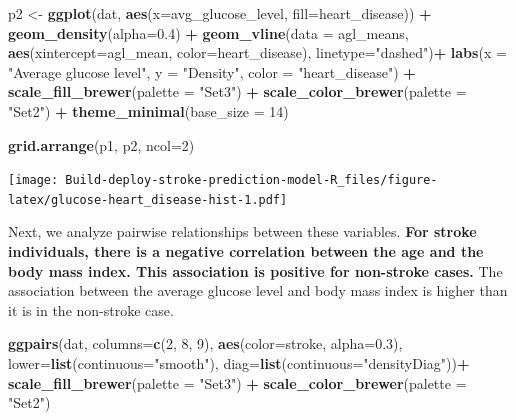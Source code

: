 \documentclass[
]{article}
\newenvironment{Shaded}{\begin{snugshade}}{\end{snugshade}}
\newcommand{\AttributeTok}[1]{\textcolor[rgb]{0.13,0.29,0.53}{#1}}
\newcommand{\DecValTok}[1]{\textcolor[rgb]{0.00,0.00,0.81}{#1}}
\newcommand{\FloatTok}[1]{\textcolor[rgb]{0.00,0.00,0.81}{#1}}
\newcommand{\FunctionTok}[1]{\textcolor[rgb]{0.13,0.29,0.53}{\textbf{#1}}}
\newcommand{\NormalTok}[1]{#1}
\newcommand{\OtherTok}[1]{\textcolor[rgb]{0.56,0.35,0.01}{#1}}
\newcommand{\SpecialCharTok}[1]{\textcolor[rgb]{0.81,0.36,0.00}{\textbf{#1}}}
\newcommand{\StringTok}[1]{\textcolor[rgb]{0.31,0.60,0.02}{#1}}
\begin{document}
\begin{Shaded}
\begin{Highlighting}[]
\NormalTok{p2 }\OtherTok{\textless{}{-}} \FunctionTok{ggplot}\NormalTok{(dat, }\FunctionTok{aes}\NormalTok{(}\AttributeTok{x=}\NormalTok{avg\_glucose\_level, }\AttributeTok{fill=}\NormalTok{heart\_disease)) }\SpecialCharTok{+}  \FunctionTok{geom\_density}\NormalTok{(}\AttributeTok{alpha=}\FloatTok{0.4}\NormalTok{) }\SpecialCharTok{+}
      \FunctionTok{geom\_vline}\NormalTok{(}\AttributeTok{data =}\NormalTok{ agl\_means, }\FunctionTok{aes}\NormalTok{(}\AttributeTok{xintercept=}\NormalTok{agl\_mean, }\AttributeTok{color=}\NormalTok{heart\_disease), }\AttributeTok{linetype=}\StringTok{"dashed"}\NormalTok{)}\SpecialCharTok{+}
      \FunctionTok{labs}\NormalTok{(}\AttributeTok{x =} \StringTok{"Average glucose level"}\NormalTok{, }\AttributeTok{y =} \StringTok{"Density"}\NormalTok{, }\AttributeTok{color =} \StringTok{"heart\_disease"}\NormalTok{) }\SpecialCharTok{+}
      \FunctionTok{scale\_fill\_brewer}\NormalTok{(}\AttributeTok{palette =} \StringTok{"Set3"}\NormalTok{) }\SpecialCharTok{+}
      \FunctionTok{scale\_color\_brewer}\NormalTok{(}\AttributeTok{palette =} \StringTok{"Set2"}\NormalTok{) }\SpecialCharTok{+}
      \FunctionTok{theme\_minimal}\NormalTok{(}\AttributeTok{base\_size =} \DecValTok{14}\NormalTok{) }

\FunctionTok{grid.arrange}\NormalTok{(p1, p2, }\AttributeTok{ncol=}\DecValTok{2}\NormalTok{)}
\end{Highlighting}
\end{Shaded}

\texttt{[image: Build-deploy-stroke-prediction-model-R\_files/figure-latex/glucose-heart\_disease-hist-1.pdf]}

Next, we analyze pairwise relationships between these variables.
\textbf{For stroke individuals, there is a negative correlation between
the age and the body mass index. This association is positive for
non-stroke cases.} The association between the average glucose level and
body mass index is higher than it is in the non-stroke case.

\begin{Shaded}
\begin{Highlighting}[]
\FunctionTok{ggpairs}\NormalTok{(dat, }\AttributeTok{columns=}\FunctionTok{c}\NormalTok{(}\DecValTok{2}\NormalTok{, }\DecValTok{8}\NormalTok{, }\DecValTok{9}\NormalTok{), }\FunctionTok{aes}\NormalTok{(}\AttributeTok{color=}\NormalTok{stroke, }\AttributeTok{alpha=}\FloatTok{0.3}\NormalTok{),}
        \AttributeTok{lower=}\FunctionTok{list}\NormalTok{(}\AttributeTok{continuous=}\StringTok{"smooth"}\NormalTok{), }\AttributeTok{diag=}\FunctionTok{list}\NormalTok{(}\AttributeTok{continuous=}\StringTok{"densityDiag"}\NormalTok{))}\SpecialCharTok{+}
  \FunctionTok{scale\_fill\_brewer}\NormalTok{(}\AttributeTok{palette =} \StringTok{"Set3"}\NormalTok{) }\SpecialCharTok{+}
  \FunctionTok{scale\_color\_brewer}\NormalTok{(}\AttributeTok{palette =} \StringTok{"Set2"}\NormalTok{)}
\end{Highlighting}
\end{Shaded}
\end{document}
